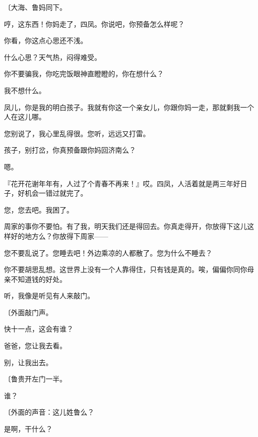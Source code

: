 {\fangsong〔大海、鲁妈同下。}

哼，这东西！你妈走了，四凤。你说吧，你预备怎么样呢？


你看，你这点心思还不浅。

什么心思？天气热，闷得难受。

你不要骗我，你吃完饭眼神直瞪瞪的，你在想什么？

我不想什么。

凤儿，你是我的明白孩子。我就有你这一个亲女儿，你跟你妈一走，那就剩我一个人在这儿哪。

您别说了，我心里乱得很。您听，远远又打雷。

孩子，别打岔，你真预备跟你妈回济南么？

嗯。

『花开花谢年年有，人过了个青春不再来！』哎。四凤，人活着就是两三年好日子，好机会一错过就完了。

您，您去吧。我困了。

周家的事你不要怕。有了我，明天我们还是得回去。你真走得开，你放得下这儿这样好的地方么？你放得下周家——

您不要乱说了。您睡去吧！外边乘凉的人都散了。您为什么不睡去？

你不要胡思乱想。这世界上没有一个人靠得住，只有钱是真的。唉，偏偏你同你母亲不知道钱的好处。

听，我像是听见有人来敲门。

{\fangsong〔外面敲门声。}

快十一点，这会有谁？

爸爸，您让我去看。

别，让我出去。

{\fangsong〔鲁贵开左门一半。}

谁？

{\fangsong〔外面的声音：这儿姓鲁么？}

是啊，干什么？

